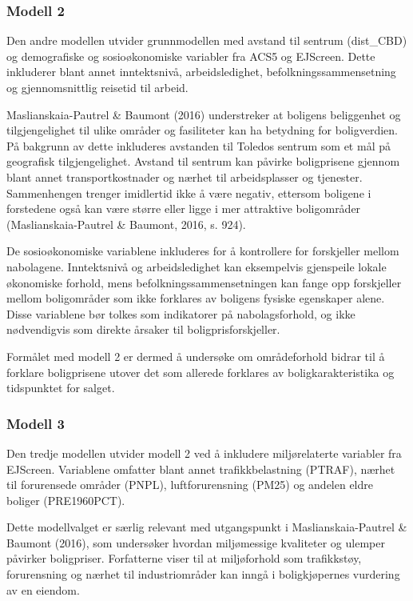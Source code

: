 \documentclass[
  norsk,
  a4paper,
]{article}
\begin{document}
\subsubsection{Modell 2}\label{modell-2}

Den andre modellen utvider grunnmodellen med avstand til sentrum
(dist\_CBD) og demografiske og sosioøkonomiske variabler fra ACS5 og
EJScreen. Dette inkluderer blant annet inntektsnivå, arbeidsledighet,
befolkningssammensetning og gjennomsnittlig reisetid til arbeid.

Maslianskaia-Pautrel \& Baumont (2016) understreker at boligens
beliggenhet og tilgjengelighet til ulike områder og fasiliteter kan ha
betydning for boligverdien. På bakgrunn av dette inkluderes avstanden
til Toledos sentrum som et mål på geografisk tilgjengelighet. Avstand
til sentrum kan påvirke boligprisene gjennom blant annet
transportkostnader og nærhet til arbeidsplasser og tjenester.
Sammenhengen trenger imidlertid ikke å være negativ, ettersom boligene i
forstedene også kan være større eller ligge i mer attraktive
boligområder (Maslianskaia-Pautrel \& Baumont, 2016, s. 924).

De sosioøkonomiske variablene inkluderes for å kontrollere for
forskjeller mellom nabolagene. Inntektsnivå og arbeidsledighet kan
eksempelvis gjenspeile lokale økonomiske forhold, mens
befolkningssammensetningen kan fange opp forskjeller mellom boligområder
som ikke forklares av boligens fysiske egenskaper alene. Disse
variablene bør tolkes som indikatorer på nabolagsforhold, og ikke
nødvendigvis som direkte årsaker til boligprisforskjeller.

Formålet med modell 2 er dermed å undersøke om områdeforhold bidrar til
å forklare boligprisene utover det som allerede forklares av
boligkarakteristika og tidspunktet for salget.

\subsubsection{Modell 3}\label{modell-3}

Den tredje modellen utvider modell 2 ved å inkludere miljørelaterte
variabler fra EJScreen. Variablene omfatter blant annet
trafikkbelastning (PTRAF), nærhet til forurensede områder (PNPL),
luftforurensning (PM25) og andelen eldre boliger (PRE1960PCT).

Dette modellvalget er særlig relevant med utgangspunkt i
Maslianskaia-Pautrel \& Baumont (2016), som undersøker hvordan
miljømessige kvaliteter og ulemper påvirker boligpriser. Forfatterne
viser til at miljøforhold som trafikkstøy, forurensning og nærhet til
industriområder kan inngå i boligkjøpernes vurdering av en eiendom.
\end{document}
